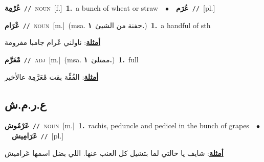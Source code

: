 \documentclass[10pt,a4paper,twoside]{article} %
\begin{document}
\begin{multicols}{2}
{\setlength\topsep{0pt}\textbf{\foreignlanguage{arabic}{عُرْمِة}}\ {\color{gray}\texttt{//}\color{black}}\ \textsc{noun}\ [f.]\ \textbf{1.}~a bunch of wheat or straw\ \ $\bullet$\ \ \setlength\topsep{0pt}\textbf{\foreignlanguage{arabic}{عُرَم}}\ {\color{gray}\texttt{//}\color{black}}\ [pl.]\ } \vspace{2mm}

{\setlength\topsep{0pt}\textbf{\foreignlanguage{arabic}{عْرَام}}\ {\color{gray}\texttt{//}\color{black}}\ \textsc{noun}\ [m.]\ \color{gray}(msa. \foreignlanguage{arabic}{حفنة من الشيئ}~\foreignlanguage{arabic}{\textbf{١.}})\color{black}\ \textbf{1.}~a handful of sth\  \begin{flushright}\color{gray}\foreignlanguage{arabic}{\textbf{\underline{\foreignlanguage{arabic}{أمثلة}}}: ناولني عْرام جامبا مفرومة}\end{flushright}\color{black}} \vspace{2mm}

{\setlength\topsep{0pt}\textbf{\foreignlanguage{arabic}{مْعَرَّم}}\ {\color{gray}\texttt{//}\color{black}}\ \textsc{adj}\ [m.]\ \color{gray}(msa. \foreignlanguage{arabic}{ممتلئ}~\foreignlanguage{arabic}{\textbf{١.}})\color{black}\ \textbf{1.}~full\  \begin{flushright}\color{gray}\foreignlanguage{arabic}{\textbf{\underline{\foreignlanguage{arabic}{أمثلة}}}: القُفِّة بقت مْعَرَّمِة عالأخير}\end{flushright}\color{black}} \vspace{2mm}

\vspace{-3mm}
\subsection*{\color{blue}\foreignlanguage{arabic}{ع.ر.م.ش}\color{blue}{}} 

{\setlength\topsep{0pt}\textbf{\foreignlanguage{arabic}{عَرْمُوش}}\ {\color{gray}\texttt{//}\color{black}}\ \textsc{noun}\ [m.]\ \textbf{1.}~rachis, peduncle and pedicel in the bunch of grapes\ \ $\bullet$\ \ \setlength\topsep{0pt}\textbf{\foreignlanguage{arabic}{عَرَامِيش}}\ {\color{gray}\texttt{//}\color{black}}\ [pl.]\  \begin{flushright}\color{gray}\foreignlanguage{arabic}{\textbf{\underline{\foreignlanguage{arabic}{أمثلة}}}: شايف يا خالتي لما بتشيل كل العنب عنها. اللي بضل اسمها عَراميش}\end{flushright}\color{black}} \vspace{2mm}


\end{multicols}
\end{document}
